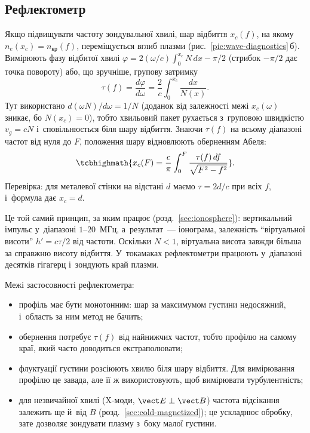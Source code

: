\subsection*{Рефлектометр}

Якщо підвищувати частоту зондувальної хвилі, шар відбиття $x_c(f)$, на якому
$n_e(x_c)=n_{\mathrm{кр}}(f)$, переміщується вглиб плазми (рис.~\ref{pic:wave-diagnostics}\,б). Вимірюють фазу відбитої хвилі
$\varphi=2(\omega/c)\int_0^{x_c}N\,dx-\pi/2$ (стрибок $-\pi/2$ дає точка повороту) або, що зручніше,
групову затримку
\begin{equation*}
	\tau(f)=\frac{d\varphi}{d\omega}=\frac2c\int_0^{x_c}\frac{dx}{N(x)}.
\end{equation*}
Тут використано $d(\omega N)/d\omega=1/N$ (доданок від залежності межі $x_c(\omega)$ зникає, бо $N(x_c)=0$), тобто хвильовий пакет рухається з~груповою швидкістю
$v_g=cN$ і~сповільнюється біля шару відбиття. Знаючи $\tau(f)$ на всьому діапазоні частот від нуля
до $F$, положення шару відновлюють оберненням Абеля:
\begin{equation*}
	\tcbhighmath{x_c(F)=\frac c\pi\int_0^F\frac{\tau(f)\,df}{\sqrt{F^2-f^2}}}.
\end{equation*}
Перевірка: для металевої стінки на відстані $d$ маємо $\tau=2d/c$ при всіх $f$, і~формула дає $x_c=d$.

Це той самий принцип, за яким працює  (розд.~\ref{sec:ionosphere}): вертикальний
імпульс у~діапазоні $1$--$20$~МГц, а~результат~--- іонограма, залежність \enquote{віртуальної висоти}
$h'=c\tau/2$ від частоти. Оскільки $N<1$, віртуальна висота завжди більша за справжню висоту відбиття.
У~токамаках рефлектометри працюють у~діапазоні десятків гігагерц і~зондують край плазми.

Межі застосовності рефлектометра:
\begin{itemize}
	\item профіль має бути монотонним: шар за максимумом густини недосяжний, і~область за ним метод не бачить;
	\item обернення потребує $\tau(f)$ від найнижчих частот, тобто профілю на самому краї, який часто
	доводиться екстраполювати;
	\item флуктуації густини розсіюють хвилю біля шару відбиття. Для вимірювання профілю це завада,
	але її ж використовують, щоб вимірювати турбулентність;
	\item для незвичайної хвилі (X-моди, $\vect E\perp\vect B$) частота відсікання залежить ще й~від $B$
	(розд.~\ref{sec:cold-magnetized}); це ускладнює обробку, зате дозволяє зондувати плазму з~боку
	малої густини.
\end{itemize}

